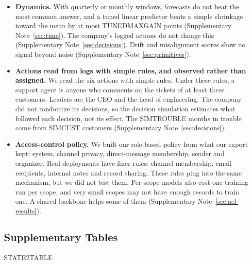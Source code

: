 \documentclass[11pt]{article}
\begin{document}
\begin{itemize}
The four seeds of the anchored version vary the reader and the anchors but not the state encoder, which is one run. We did not test questions that need several systems' records at once, or that come with several records of the customer.
\item \textbf{Dynamics.} With quarterly or monthly windows, forecasts do not beat the most common answer, and a tuned linear predictor beats a simple shrinkage toward the mean by at most TUNEDMAXGAIN points (Supplementary Note~\ref{sec:time}). The company's logged actions do not change this (Supplementary Note~\ref{sec:decisions}). Drift and misalignment scores show no signal beyond noise (Supplementary Note~\ref{sec:primitives}).
\item \textbf{Actions read from logs with simple rules, and observed rather than assigned.} We read the six actions with simple rules. Under these rules, a support agent is anyone who comments on the tickets of at least three customers. Leaders are the CEO and the head of engineering. The company did not randomize its decisions, so the decision simulation estimates what followed each decision, not its effect. The SIMTROUBLE months in trouble come from SIMCUST customers (Supplementary Note~\ref{sec:decisions}).
\item \textbf{Access-control policy.} We built our role-based policy from what our export kept: system, channel privacy, direct-message membership, sender and organizer. Real deployments have finer rules: channel membership, email recipients, internal notes and record sharing. These rules plug into the same mechanism, but we did not test them. Per-scope models also cost one training run per scope, and very small scopes may not have enough records to train one. A shared backbone helps some of them (Supplementary Note~\ref{sec:acl-results}).
\end{itemize}

\clearpage
\subsection{Supplementary Tables}

\begin{table}[h]
\centering
\small
\caption{\textbf{Facts read from customer-quarter states.} Accuracy of linear probes that hold out one customer at a time (frozen day-1 encoders, all records through day~2). We concatenate two channels after we standardize each one and scale it to the same total variance. ``System shares'' adds the share of the state's records from each system. Majority class this quarter: tickets 0.57, priority 0.57, call 0.71, stage 0.29. Majority class next quarter: 0.49 on average (Methods). One seed.}
\label{tab:twochannel}
STATE2TABLE
\end{table}
\end{document}
